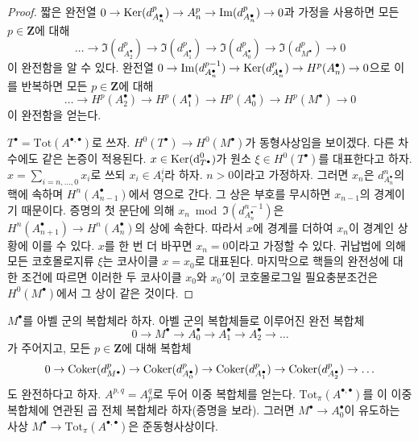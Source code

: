 \begin{proof}
짧은 완전열
$0 \to \mathop{\mathrm{Ker}}(d^p_{A_n^\bullet}) \to A_n^p \to
\mathop{\mathrm{Im}}(d^p_{A_n^\bullet}) \to 0$과 가정을 사용하면 모든
$p \in \mathbf{Z}$에 대해
$$
\ldots \to \Im(d_{A_2^\bullet}^p) \to \Im(d_{A_1^\bullet}^p)
\to \Im(d_{A_0^\bullet}^p) \to \Im(d_{M^\bullet}^p) \to 0
$$
이 완전함을 알 수 있다. 완전열
$0 \to \mathop{\mathrm{Im}}(d^{p - 1}_{A_n^\bullet}) \to \mathop{\mathrm{Ker}}(d^p_{A_n^\bullet})
\to H^p(A_n^\bullet) \to 0$으로 이를 반복하면 모든
$p \in \mathbf{Z}$에 대해
$$
\ldots \to H^p(A_2^\bullet) \to H^p(A_1^\bullet)
\to H^p(A_0^\bullet) \to H^p(M^\bullet) \to 0
$$
이 완전함을 얻는다.

\medskip\noindent
$T^\bullet = \text{Tot}(A^{\bullet, \bullet})$로 쓰자.
$H^0(T^\bullet) \to H^0(M^\bullet)$가 동형사상임을 보이겠다. 다른
차수에도 같은 논증이 적용된다. $x \in \mathop{\mathrm{Ker}}(\text{d}_{T^\bullet}^0)$가
원소 $\xi \in H^0(T^\bullet)$를 대표한다고 하자.
$x = \sum_{i = n, \ldots, 0} x_i$로 쓰되 $x_i \in A_i^i$라 하자.
$n > 0$이라고 가정하자. 그러면 $x_n$은
$d_{A_n^\bullet}^n$의 핵에 속하며 $H^n(A_{n - 1}^\bullet)$에서
영으로 간다. 그 상은 부호를 무시하면 $x_{n - 1}$의 경계이기 때문이다.
증명의 첫 문단에 의해
$x_n \bmod \Im(d^{n - 1}_{A_n^\bullet})$은
$H^n(A_{n + 1}^\bullet) \to H^n(A_n^\bullet)$의 상에 속한다. 따라서
$x$에 경계를 더하여 $x_n$이 경계인 상황에 이를 수 있다. $x$를 한 번
더 바꾸면 $x_n = 0$이라고 가정할 수 있다. 귀납법에 의해 모든
코호몰로지류 $\xi$는 코사이클 $x = x_0$로 대표된다. 마지막으로 핵들의
완전성에 대한 조건에 따르면 이러한 두 코사이클 $x_0$와 $x_0'$이
코호몰로그일 필요충분조건은 $H^0(M^\bullet)$에서 그 상이 같은 것이다.
\end{proof}

\begin{lemma}
\label{lemma-good-right-resolution-gives-qis}
$M^\bullet$를 아벨 군의 복합체라 하자. 아벨 군의 복합체들로 이루어진
완전 복합체
$$
0 \to M^\bullet \to A_0^\bullet \to A_1^\bullet \to A_2^\bullet \to \ldots
$$
가 주어지고, 모든 $p \in \mathbf{Z}$에 대해 복합체
$$
0 \to
\mathop{\mathrm{Coker}}(d_{M^\bullet}^p) \to
\mathop{\mathrm{Coker}}(d_{A_0^\bullet}^p) \to
\mathop{\mathrm{Coker}}(d_{A_1^\bullet}^p) \to
\mathop{\mathrm{Coker}}(d_{A_2^\bullet}^p) \to \ldots
$$
도 완전하다고 하자. $A^{p, q} = A_p^q$로 두어 이중 복합체를 얻는다.
$\text{Tot}_\pi(A^{\bullet, \bullet})$를 이 이중 복합체에 연관된 곱
전체 복합체라 하자(증명을 보라). 그러면 $M^\bullet \to A_0^\bullet$이
유도하는 사상 $M^\bullet \to \text{Tot}_\pi(A^{\bullet, \bullet})$은
준동형사상이다.
\end{lemma}

